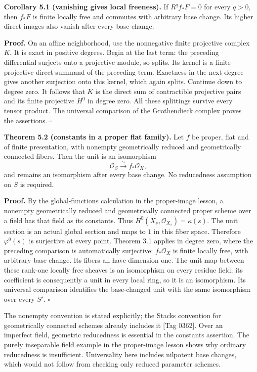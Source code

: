 \documentclass[11pt]{article}
\begin{document}
\textbf{Corollary 5.1 (vanishing gives local freeness).} If
\(R^qf_*F=0\) for every \(q>0\), then \(f_*F\) is finite locally free
and commutes with arbitrary base change. Its higher direct images also
vanish after every base change.

\textbf{Proof.} On an affine neighborhood, use the nonnegative finite
projective complex \(K\). It is exact in positive degrees. Begin at the
last term: the preceding differential surjects onto a projective module,
so splits. Its kernel is a finite projective direct summand of the
preceding term. Exactness in the next degree gives another surjection
onto this kernel, which again splits. Continue down to degree zero. It
follows that \(K\) is the direct sum of contractible projective pairs
and its finite projective \(H^0\) in degree zero. All these splittings
survive every tensor product. The universal comparison of the
Grothendieck complex proves the assertions. \(\square\)

\textbf{Theorem 5.2 (constants in a proper flat family).} Let \(f\) be
proper, flat and of finite presentation, with nonempty geometrically
reduced and geometrically connected fibers. Then the unit is an
isomorphism \[
\mathcal O_S\xrightarrow{\sim}f_*\mathcal O_X,
\] and remains an isomorphism after every base change. No reducedness
assumption on \(S\) is required.

\textbf{Proof.} By the global-functions calculation in the proper-image
lesson, a nonempty geometrically reduced and geometrically connected
proper scheme over a field has that field as its constants. Thus
\(H^0(X_s,\mathcal O_{X_s})=\kappa(s)\). The unit section is an actual
global section and maps to \(1\) in this fiber space. Therefore
\(\varphi^0(s)\) is surjective at every point. Theorem 3.1 applies in
degree zero, where the preceding comparison is automatically surjective:
\(f_*\mathcal O_X\) is finite locally free, with arbitrary base change.
Its fibers all have dimension one. The unit map between these rank-one
locally free sheaves is an isomorphism on every residue field; its
coefficient is consequently a unit in every local ring, so it is an
isomorphism. Its universal comparison identifies the base-changed unit
with the same isomorphism over every \(S'\). \(\square\)

The nonempty convention is stated explicitly; the Stacks convention for
geometrically connected schemes already includes it {[}Tag 0362{]}. Over
an imperfect field, geometric reducedness is essential in the constants
assertion. The purely inseparable field example in the proper-image
lesson shows why ordinary reducedness is insufficient. Universality here
includes nilpotent base changes, which would not follow from checking
only reduced parameter schemes.
\end{document}
